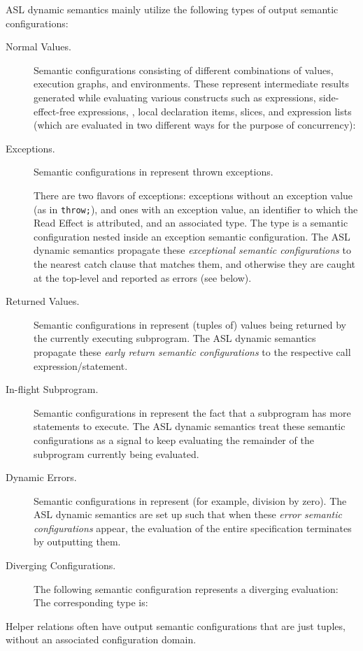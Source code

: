 ASL dynamic semantics mainly utilize the following types of output semantic configurations:
\begin{description}
  \item[Normal Values.]\hypertarget{def-normal}{}
  Semantic configurations consisting of different combinations of values,
  execution graphs, and environments. These represent intermediate results
  generated while evaluating various constructs such as
  expressions, side-effect-free expressions, \assignableexpressions,
  local declaration items, slices, and expression lists
  (which are evaluated in two different ways for the purpose of concurrency):

  \item[Exceptions.] Semantic configurations in  represent thrown exceptions.

  There are two flavors of exceptions:
  exceptions without an exception value (as in \texttt{throw;}), and ones with an exception value,
  an identifier to which the Read Effect is attributed, and an associated type.
  The type  is a semantic configuration nested inside an exception semantic configuration.
  The ASL dynamic semantics propagate these \emph{exceptional semantic configurations} to the nearest catch clause that matches
  them, and otherwise they are caught at the top-level and reported as errors (see \dynamicerrorsterm{} below).

  \item[Returned Values.] Semantic configurations in 
  represent (tuples of) values being returned by the currently executing subprogram.
  The ASL dynamic semantics propagate these \emph{early return semantic configurations} to the respective call expression/statement.

  \item[In-flight Subprogram.] Semantic configurations in 
  represent the fact that a subprogram has more statements to execute.
  The ASL dynamic semantics treat these semantic configurations as a signal to keep evaluating the remainder
  of the subprogram currently being evaluated.

  \item[Dynamic Errors.] Semantic configurations in 
  represent \dynamicerrorsterm{} (for example, division by zero).
  The ASL dynamic semantics are set up such that when these \emph{error semantic configurations} appear,
  the evaluation of the entire specification terminates by outputting them.

  \item[Diverging Configurations.] The following semantic configuration
  represents a diverging evaluation:
The corresponding type is:

\end{description}
Helper relations often have output semantic configurations that are just tuples, without an associated configuration domain.

